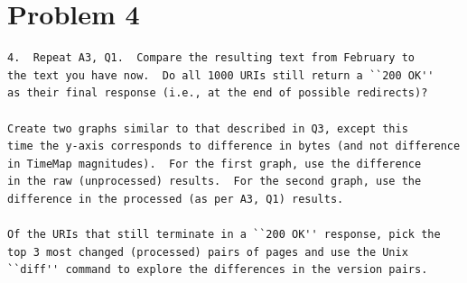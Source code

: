 \section{Problem 4}
\label{part4}
\begin{verbatim}
4.  Repeat A3, Q1.  Compare the resulting text from February to 
the text you have now.  Do all 1000 URIs still return a ``200 OK'' 
as their final response (i.e., at the end of possible redirects)?

Create two graphs similar to that described in Q3, except this 
time the y-axis corresponds to difference in bytes (and not difference
in TimeMap magnitudes).  For the first graph, use the difference
in the raw (unprocessed) results.  For the second graph, use the 
difference in the processed (as per A3, Q1) results.

Of the URIs that still terminate in a ``200 OK'' response, pick the
top 3 most changed (processed) pairs of pages and use the Unix
``diff'' command to explore the differences in the version pairs.
\end{verbatim}
